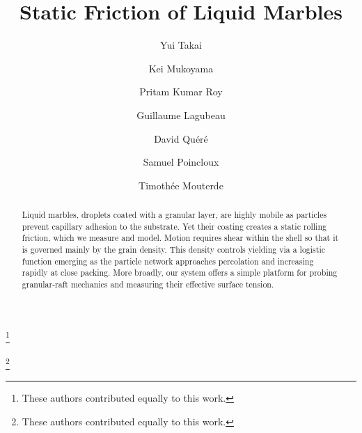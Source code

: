 \documentclass[twocolumn, prl,
 amsmath,amssymb,
 superscriptaddress,aps,
]{revtex4-2}
\begin{document}
\title{Static Friction of Liquid Marbles}

\author{Yui Takai}
\thanks{These authors contributed equally to this work.}

\author{Kei Mukoyama}
\thanks{These authors contributed equally to this work.}

\author{Pritam Kumar Roy}

\author{Guillaume Lagubeau}

\author{David Quéré}

\author{Samuel Poincloux}

\author{Timothée Mouterde}

\begin{abstract}
Liquid marbles, droplets coated with a granular layer, are highly mobile as particles prevent capillary adhesion to the substrate. Yet their coating creates a static rolling friction, which we measure and model. Motion requires shear within the shell so that it is governed mainly by the grain density. This density controls yielding via a logistic function emerging as the particle network approaches percolation and increasing rapidly at close packing. More broadly, our system offers a simple platform for probing granular-raft mechanics and measuring their effective surface tension.

\end{abstract}

\maketitle
\end{document}
